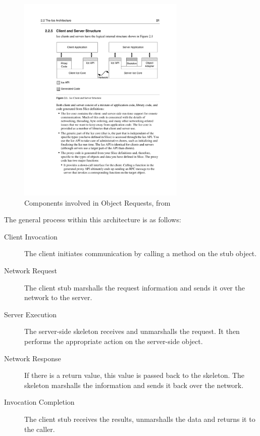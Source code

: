\documentclass{acm_proc_article-sp}
\begin{document}

\begin{figure}
\centering
\includegraphics[width=8cm]{icefig21.pdf}
\caption{Components involved in Object Requests, from \cite{icemanual}}
\label{fig:icefig21}
\end{figure}

The general process within this architecture is as follows:
\begin{description}
\item[Client Invocation] The client initiates communication by calling a method on the stub object.
\item[Network Request] The client stub marshalls the request information and sends it over the network to the server.
\item[Server Execution] The server-side skeleton receives and unmarshalls the request.  It then performs the appropriate action on the server-side object.
\item[Network Response] If there is a return value, this value is passed back to the skeleton.  The skeleton marshalls the information and sends it back over the network.
\item[Invocation Completion] The client stub receives the results, unmarshalls the data and returns it to the caller.
\end{description}
\end{document}
